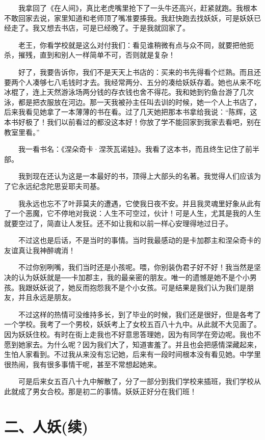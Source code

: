  　　我拿回了《在人间》，真比老虎嘴里抢下了一头牛还高兴，赶紧就跑。我根本不敢回家去说，家里知道和老师顶了嘴准要揍我。我赶快跑去找妖妖，可是妖妖已经走了。我又想去书店，可是已经晚了。于是我就回家了。 
 
 　　老王，你看学校就是这么对付我们：看见谁稍微有点与众不同，就要把他扼杀，摧残，直到和别人一样简单不可，否则就是复杂！ 
 
 　　好了，我要告诉你，我们不是天天上书店的：买来的书先得看个烂熟。而且还要两个人凑够七八毛钱时才去。我经常两分、五分的凑给妖妖存着。她也从来不吃冰棍了，连上天然游泳场两分钱的存衣钱也舍不得花。我和她到钓鱼台游了几次泳，都是把衣服放在河边。那一天我被孙主任叫去训的时候，她一个人上书店了，后来我看见她拿了一本薄薄的书在看。过了几天她把那本书拿给我说：“陈辉，这本书好极了！我们以前看过的都没这本好！你放了学不能回家到我家去看吧，别在教室里看。” 
 
 　　我一看书名：《涅朵奇卡·涅茨瓦诺娃》。我看了这本书，而且终生记住了前半部。 
 
 　　我到现在还认为这是一本最好的书，顶得上大部头的名著。我觉得人们应该为了它永远纪念陀思妥耶夫司基。 
 
 　　我永远也忘不了叶菲莫夫的遭遇，它使我日夜不安。并且我灵魂里好象从此有了一个恶魔，它不停地对我说：人生不可空过，伙计！可是人生，尤其是我的人生就要空过了，简直让人发狂。还不如让我和以前一样心安理得地过日子。 
 
 　　不过这也是后话，不是当时的事情。当时我最感动的是卡加郡主和涅朵奇卡的友谊真让我神醉魂消！ 
 
 　　不过你别咧嘴，我们当时还是小孩呢。喂，你别装伪君子好不好！我当然是坚决的认为妖妖就是──卡加郡主，我的最亲密的朋友。唯一的遗憾是她不是个小男孩。我跟妖妖说了，她反而抱怨我不是个小女孩。可是结果是我们认为我们是朋友，并且永远是朋友。 
 
 　　不过这样的热情可没维持多长，到了毕业的时候，我们还是很好，但是各考了一个学校。我考了一个男校，妖妖考上了女校五百八十九中。从此就不大见面了。因为妖妖住校。有时在街上走我也不好意思答理她，因为有同学在旁边呢。我也不愿到她家去。为什么呢？因为我们大了，知道害羞了。并且也会把感情深藏起来，生怕人家看到。不过我从来没有忘记她，后来有一段时间根本没有看见她。中学里很热闹，我有很多事情干呢，甚至不常想起她来。 
 
 　　可是后来女五百八十九中解散了，分了一部分到我们学校来插班，我们学校从此就成了男女合校。那是初二的事情。妖妖正好分在我们班！ 

\section{二、人妖(续)}
 
